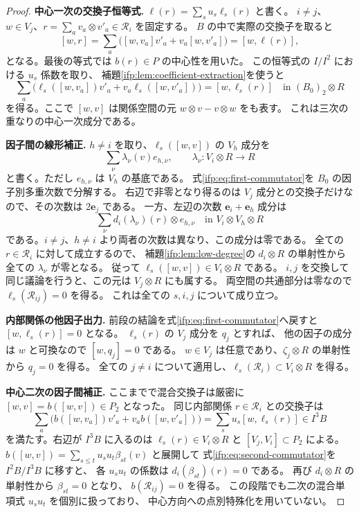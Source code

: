 \begin{proof}
\textbf{中心一次の交換子恒等式.}
$\ell(r)=\sum_su_s\ell_s(r)$ と書く。
$i\ne j$、$w\in V_j$、$r=\sum_av_a\otimes v'_a\in\mathcal R_i$ を固定する。
$B$ の中で実際の交換子を取ると
\[
 [w,r]=\sum_a\bigl([w,v_a]v'_a+v_a[w,v'_a]\bigr)
                 =[w,\ell(r)],
\]
となる。最後の等式では $b(r)\in P$ の中心性を用いた。
この恒等式の $I/I^2$ における $u_s$ 係数を取り、
補題\ref{ifp:lem:coefficient-extraction}を使うと
\begin{equation}\label{ifp:eq:first-commutator}
 \sum_a\bigl(\ell_s([w,v_a])v'_a
                  +v_a\ell_s([w,v'_a])\bigr)
                  =[w,\ell_s(r)]
          \quad\text{in }(B_0)_2\otimes R
\end{equation}
を得る。ここで $[w,v]$ は関係空間の元 $w\otimes v-v\otimes w$ をも表す。
これは三次の重なりの中心一次成分である。

\textbf{因子間の線形補正.}
$h\ne i$ を取り、$\ell_s([w,v])$ の $V_h$ 成分を
\[
                  \sum_\nu\lambda_\nu(v)e_{h,\nu},
           \qquad \lambda_\nu:V_i\otimes R\longrightarrow R
\]
と書く。ただし $e_{h,\nu}$ は $V_h$ の基底である。
式\eqref{ifp:eq:first-commutator}を $B_0$ の因子別多重次数で分解する。
右辺で非零となり得るのは $V_j$ 成分との交換子だけなので、その次数は $2\mathbf e_j$ である。
一方、左辺の次数 $\mathbf e_i+\mathbf e_h$ 成分は
\[
                  \sum_\nu d_i(\lambda_\nu)(r)\otimes e_{h,\nu}
                         \quad\text{in }V_i\otimes V_h\otimes R
\]
である。$i\ne j$、$h\ne i$ より両者の次数は異なり、この成分は零である。
全ての $r\in\mathcal R_i$ に対して成立するので、
補題\ref{ifp:lem:low-degree}の $d_i\otimes R$ の単射性から全ての $\lambda_\nu$ が零となる。
従って $\ell_s([w,v])\in V_i\otimes R$ である。
$i,j$ を交換して同じ議論を行うと、この元は $V_j\otimes R$ にも属する。
両空間の共通部分は零なので $\ell_s(\mathcal R_{ij})=0$ を得る。
これは全ての $s,i,j$ について成り立つ。

\textbf{内部関係の他因子出力.}
前段の結論を式\eqref{ifp:eq:first-commutator}へ戻すと
$[w,\ell_s(r)]=0$ となる。
$\ell_s(r)$ の $V_j$ 成分を $q_j$ とすれば、
他の因子の成分は $w$ と可換なので $[w,q_j]=0$ である。
$w\in V_j$ は任意であり、$\zeta_j\otimes R$ の単射性から $q_j=0$ を得る。
全ての $j\ne i$ について適用し、$\ell_s(\mathcal R_i)\subset V_i\otimes R$ を得る。

\textbf{中心二次の因子間補正.}
ここまでで混合交換子は厳密に $[w,v]=b([w,v])\in P_2$ となった。
同じ内部関係 $r\in\mathcal R_i$ との交換子は
\begin{equation}\label{ifp:eq:second-commutator}
 \sum_a\bigl(b([w,v_a])v'_a+v_ab([w,v'_a])\bigr)
               =\sum_su_s[w,\ell_s(r)]\in I^3B
\end{equation}
を満たす。右辺が $I^3B$ に入るのは
$\ell_s(r)\in V_i\otimes R$ と $[V_j,V_i]\subset P_2$ による。
$b([w,v])=\sum_{s\le t}u_su_t\beta_{st}(v)$ と展開して
式\eqref{ifp:eq:second-commutator}を $I^2B/I^3B$ に移すと、
各 $u_su_t$ の係数は $d_i(\beta_{st})(r)=0$ である。
再び $d_i\otimes R$ の単射性から $\beta_{st}=0$ となり、
$b(\mathcal R_{ij})=0$ を得る。
この段階でも二次の混合単項式 $u_su_t$ を個別に扱っており、
中心方向への点別特殊化を用いていない。


\end{proof}

